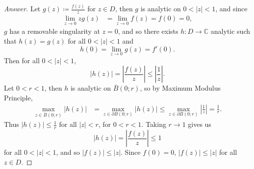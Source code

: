 \documentclass[12pt]{article}
\newcommand{\cx}{\mathbb{C}}
\newcommand{\abs}[1]{\left| #1 \right|}
\theoremstyle{definition}
\begin{document}
\begin{proof}[Answer]
    Let $g(z) \coloneqq \frac{f(z)}{z}$ for $z \in D$, then $g$ is analytic on $0 < |z| < 1$, and since
    \begin{align*}
        \lim\limits_{z \to 0} z g(z) & = \lim\limits_{z \to 0} f(z) = f(0) = 0,
    \end{align*}
    $g$ has a removable singularity at $z = 0$, and so there exists $h : D \to \cx$ analytic such that $h(z) = g(z)$ for all $0 < |z| < 1$ and 
    \[
        h(0) = \lim\limits_{z \to 0} g(z) = f'(0).
    \]
    Then for all $0 < |z| < 1$, 
    \[
        \abs{ h(z) } = \abs{ \frac{f(z)}{z} } \leq \abs{ \frac{1}{z} }.
    \]
    Let $0 < r < 1$, then $h$ is analytic on $\bar{B}(0;r)$, so by Maximum Modulus Principle, 
    \begin{align*}
        \max\limits_{z \in \bar{B}(0;r)} \abs{ h(z) } & = \max\limits_{z \in \partial B(0;r)} \abs{ h(z) } \leq \max\limits_{z \in \partial B(0;r)} \abs{ \frac{1}{z} } = \frac{1}{r}.
    \end{align*}
    Thus $\abs{ h(z) } \leq \frac{1}{r}$ for all $|z| < r$, for $0 < r < 1$. Taking $r \to 1$ gives us 
    \[
        \abs{ h(z) } = \abs{ \frac{f(z)}{z} } \leq 1
    \]
    for all $0 < |z| < 1$, and so $\abs{ f(z) } \leq |z|$. Since $f(0) = 0$, $\abs{ f(z) } \leq |z|$ for all $z \in D$.
    

\end{proof}
\end{document}
